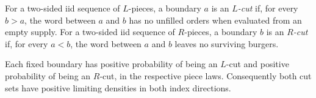 \begin{definition}
For a two-sided iid sequence of $L$-pieces, a boundary $a$ is an
\emph{$L$-cut} if, for every $b>a$, the word between $a$ and $b$ has no
unfilled orders when evaluated from an empty supply.
For a two-sided iid sequence of $R$-pieces, a boundary $b$ is an
\emph{$R$-cut} if, for every $a<b$, the word between $a$ and $b$ leaves
no surviving burgers.
\end{definition}

\begin{lemma}
\label{ladder:cuts}
Each fixed boundary has positive probability of being an $L$-cut and
positive probability of being an $R$-cut, in the respective piece laws.
Consequently both cut sets have positive limiting densities in both
index directions.
\end{lemma}

